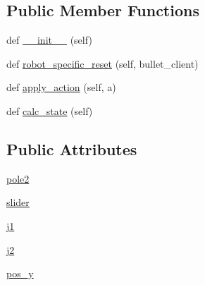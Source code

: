 \subsection*{Public Member Functions}
\begin{DoxyCompactItemize}
\item 
def \hyperlink{classpybullet-gym_1_1pybulletgym_1_1envs_1_1roboschool_1_1robots_1_1pendula_1_1inverted__double_632710b238162c34f237573ee2b501d2_a2f2c6ec0ef199ae3d8ca24b78e76d3b3}{\+\_\+\+\_\+init\+\_\+\+\_\+} (self)
\item 
def \hyperlink{classpybullet-gym_1_1pybulletgym_1_1envs_1_1roboschool_1_1robots_1_1pendula_1_1inverted__double_632710b238162c34f237573ee2b501d2_a2d36a62586f571061ee8ba68897d52df}{robot\+\_\+specific\+\_\+reset} (self, bullet\+\_\+client)
\item 
def \hyperlink{classpybullet-gym_1_1pybulletgym_1_1envs_1_1roboschool_1_1robots_1_1pendula_1_1inverted__double_632710b238162c34f237573ee2b501d2_ad4691e9209166b6ada4fff621b1a7177}{apply\+\_\+action} (self, a)
\item 
def \hyperlink{classpybullet-gym_1_1pybulletgym_1_1envs_1_1roboschool_1_1robots_1_1pendula_1_1inverted__double_632710b238162c34f237573ee2b501d2_ac90c6516b8319e993b34d3cf8358af36}{calc\+\_\+state} (self)
\end{DoxyCompactItemize}
\subsection*{Public Attributes}
\begin{DoxyCompactItemize}
\item 
\hyperlink{classpybullet-gym_1_1pybulletgym_1_1envs_1_1roboschool_1_1robots_1_1pendula_1_1inverted__double_632710b238162c34f237573ee2b501d2_a780d79b5ea860ffeea93d129ed5cab37}{pole2}
\item 
\hyperlink{classpybullet-gym_1_1pybulletgym_1_1envs_1_1roboschool_1_1robots_1_1pendula_1_1inverted__double_632710b238162c34f237573ee2b501d2_ae38b345468176daa3891923ba3a8e877}{slider}
\item 
\hyperlink{classpybullet-gym_1_1pybulletgym_1_1envs_1_1roboschool_1_1robots_1_1pendula_1_1inverted__double_632710b238162c34f237573ee2b501d2_a835ef3cd5794dd63484b2388db9778ec}{j1}
\item 
\hyperlink{classpybullet-gym_1_1pybulletgym_1_1envs_1_1roboschool_1_1robots_1_1pendula_1_1inverted__double_632710b238162c34f237573ee2b501d2_adffb8543dd621875c85ae484c22e86df}{j2}
\item 
\hyperlink{classpybullet-gym_1_1pybulletgym_1_1envs_1_1roboschool_1_1robots_1_1pendula_1_1inverted__double_632710b238162c34f237573ee2b501d2_a76e46de1ca4e4f6154ce343688129708}{pos\+\_\+y}
\end{DoxyCompactItemize}


